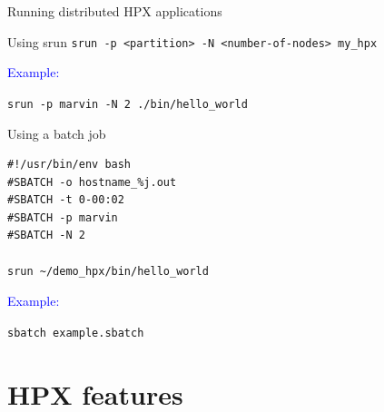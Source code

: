 \documentclass[12pt,t]{beamer}
\begin{document}
\begin{frame}[fragile]{Running distributed HPX applications}

\begin{block}{Using srun}
\lstinline|srun -p <partition> -N <number-of-nodes> my_hpx |

\textcolor{blue}{Example:}

\lstinline|srun -p marvin -N 2 ./bin/hello_world|
\end{block}

\begin{block}{Using a batch job}

\begin{lstlisting}
#!/usr/bin/env bash
#SBATCH -o hostname_%j.out
#SBATCH -t 0-00:02
#SBATCH -p marvin
#SBATCH -N 2

srun ~/demo_hpx/bin/hello_world
\end{lstlisting}

\textcolor{blue}{Example:}

\lstinline|sbatch example.sbatch|

\end{block}
\end{frame}

\section{HPX features}
\end{document}
